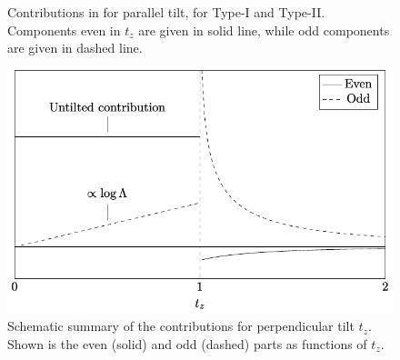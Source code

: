 \documentclass[%
 reprint,
 amsmath,amssymb,
 aps,
]{revtex4-2}
\begin{document}
\begin{figure}[p]
\caption{Contributions in for parallel tilt, for Type-I and Type-II.
  Components even in \( t_z \) are given in solid line, while odd components are given in dashed line.
}
\end{figure}

\begin{figure}[p]
  \centering
  \includegraphics[width=.8\textwidth]{figures/schematic_tz}
  \caption{Schematic summary of the contributions for perpendicular tilt \(t_z \). Shown is the even (solid) and odd (dashed) parts as functions of \(t_z\).}
  \label{fig:schematic_tz}
\end{figure}
\end{document}
